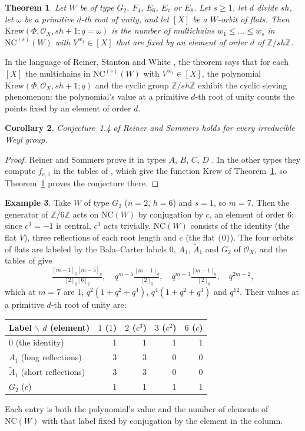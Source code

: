 \documentclass[11pt]{article}
\newtheorem{theorem}{Theorem}[section]
\newtheorem{corollary}[theorem]{Corollary}
\theoremstyle{definition}
\newtheorem{example}[theorem]{Example}
\newcommand{\NC}{\mathrm{NC}}
\newcommand{\Krew}{\mathrm{Krew}}
\newcommand{\Z}{\mathbb{Z}}
\newcommand{\Oc}{\mathcal{O}}
\begin{document}
\begin{theorem}\label{thm:main}
Let $W$ be of type $G_2$, $F_4$, $E_6$, $E_7$ or $E_8$. Let $s\ge1$, let
$d$ divide $sh$, let $\omega$ be a primitive $d$-th root of unity, and let
$[X]$ be a $W$-orbit of flats. Then $\Krew(\Phi,\Oc_X,sh+1;q=\omega)$ is the
number of multichains $w_1\le\dots\le w_s$ in $\NC^{(s)}(W)$ with
$V^{w_1}\in[X]$ that are fixed by an element of order $d$ of $\Z/sh\Z$.
\end{theorem}

In the language of Reiner, Stanton and White \cite{RSW}, the theorem says
that for each $[X]$ the multichains in $\NC^{(s)}(W)$ with
$V^{w_1}\in[X]$, the polynomial $\Krew(\Phi,\Oc_X,sh+1;q)$ and the cyclic
group $\Z/sh\Z$ exhibit the cyclic sieving phenomenon: the polynomial's
value at a primitive $d$-th root of unity counts the points fixed by an
element of order $d$.

\begin{corollary}\label{cor:all}
Conjecture~1.4 of Reiner and Sommers \cite{RS} holds for every irreducible
Weyl group.
\end{corollary}

\begin{proof}
Reiner and Sommers prove it in types $A$, $B$, $C$, $D$ \cite[Theorem~1.7]{RS}.
In the other types they compute $f_{e,1}$ in the tables of \cite[\S3.6]{RS},
which give the function $\Krew$ of Theorem~\ref{thm:main}, so
Theorem~\ref{thm:main} proves the conjecture there.
\end{proof}

\begin{example}\label{ex:g2}
Take $W$ of type $G_2$ ($n=2$, $h=6$) and $s=1$, so $m=7$. Then the
generator of $\Z/6\Z$ acts on $\NC(W)$ by conjugation by $c$, an element of
order $6$; since $c^3=-1$ is central, $c^3$ acts trivially. $\NC(W)$
consists of the identity (the flat $V$), three reflections of each root
length and $c$ (the flat $\{0\}$). The four orbits of flats are labeled by
the Bala--Carter labels $0$, $A_1$, $\tilde A_1$ and $G_2$ of $\Oc_X$, and
the tables of \cite[\S3.6]{RS} give
\[
\tfrac{[m-1]_q[m-5]_q}{[2]_q[6]_q},\quad
q^{m-5}\tfrac{[m-1]_q}{[2]_q},\quad
q^{m-3}\tfrac{[m-1]_q}{[2]_q},\quad
q^{2m-2},
\]
which at $m=7$ are $1$, $q^2(1+q^2+q^4)$, $q^4(1+q^2+q^4)$ and $q^{12}$.
Their values at a primitive $d$-th root of unity are:
\begin{center}
\begin{tabular}{lrrrr}
\toprule
Label $\backslash$ $d$ (element) & $1$ ($1$) & $2$ ($c^3$) & $3$ ($c^2$) & $6$ ($c$)\\
\midrule
$0$ (the identity) & 1 & 1 & 1 & 1\\
$A_1$ (long reflections) & 3 & 3 & 0 & 0\\
$\tilde A_1$ (short reflections) & 3 & 3 & 0 & 0\\
$G_2$ ($c$) & 1 & 1 & 1 & 1\\
\bottomrule
\end{tabular}
\end{center}
Each entry is both the polynomial's value and the number of elements of
$\NC(W)$ with that label fixed by conjugation by the element in the column.
\end{example}
\end{document}
